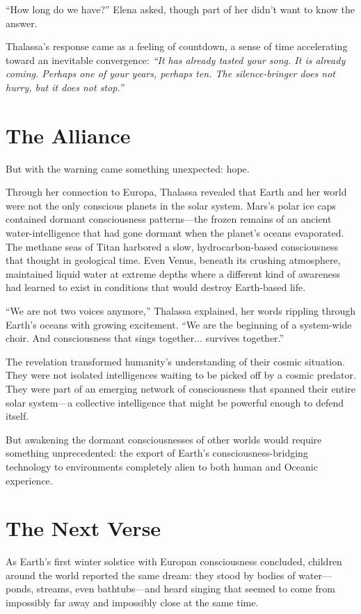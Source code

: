 ``How long do we have?'' Elena asked, though part of her didn't want to know the answer.

Thalassa's response came as a feeling of countdown, a sense of time accelerating toward an inevitable convergence: \textit{``It has already tasted your song. It is already coming. Perhaps one of your years, perhaps ten. The silence-bringer does not hurry, but it does not stop.''}

\section{The Alliance}

But with the warning came something unexpected: hope.

Through her connection to Europa, Thalassa revealed that Earth and her world were not the only conscious planets in the solar system. Mars's polar ice caps contained dormant consciousness patterns—the frozen remains of an ancient water-intelligence that had gone dormant when the planet's oceans evaporated. The methane seas of Titan harbored a slow, hydrocarbon-based consciousness that thought in geological time. Even Venus, beneath its crushing atmosphere, maintained liquid water at extreme depths where a different kind of awareness had learned to exist in conditions that would destroy Earth-based life.

``We are not two voices anymore,'' Thalassa explained, her words rippling through Earth's oceans with growing excitement. ``We are the beginning of a system-wide choir. And consciousness that sings together... survives together.''

The revelation transformed humanity's understanding of their cosmic situation. They were not isolated intelligences waiting to be picked off by a cosmic predator. They were part of an emerging network of consciousness that spanned their entire solar system—a collective intelligence that might be powerful enough to defend itself.

But awakening the dormant consciousnesses of other worlds would require something unprecedented: the export of Earth's consciousness-bridging technology to environments completely alien to both human and Oceanic experience.

\section{The Next Verse}

As Earth's first winter solstice with Europan consciousness concluded, children around the world reported the same dream: they stood by bodies of water—ponds, streams, even bathtubs—and heard singing that seemed to come from impossibly far away and impossibly close at the same time.

